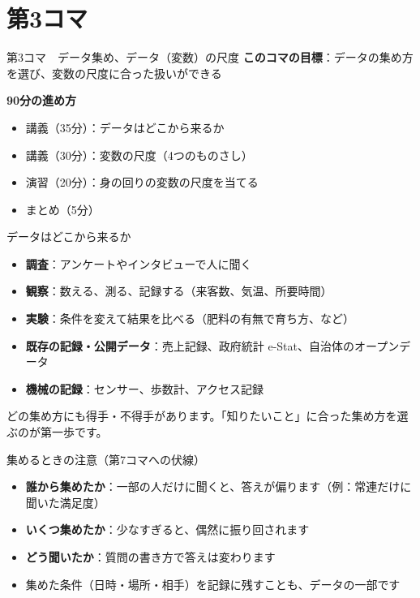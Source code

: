 \documentclass[aspectratio=169,11pt]{beamer}
\newcommand{\sess}[3]{%
\begin{frame}{#1}
\textbf{このコマの目標}：#2

\vspace{0.6em}
\textbf{90分の進め方}
\begin{itemize}
#3
\end{itemize}
\end{frame}}
\begin{document}
\section{第3コマ}
\sess{第3コマ　データ集め、データ（変数）の尺度}{データの集め方を選び、変数の尺度に合った扱いができる}
{\item 講義（35分）：データはどこから来るか
\item 講義（30分）：変数の尺度（4つのものさし）
\item 演習（20分）：身の回りの変数の尺度を当てる
\item まとめ（5分）}

\begin{frame}{データはどこから来るか}
\begin{itemize}
\item \textbf{調査}：アンケートやインタビューで人に聞く
\item \textbf{観察}：数える、測る、記録する（来客数、気温、所要時間）
\item \textbf{実験}：条件を変えて結果を比べる（肥料の有無で育ち方、など）
\item \textbf{既存の記録・公開データ}：売上記録、政府統計 e-Stat、自治体のオープンデータ
\item \textbf{機械の記録}：センサー、歩数計、アクセス記録
\end{itemize}
\vspace{0.5em}
どの集め方にも得手・不得手があります。「知りたいこと」に合った集め方を選ぶのが第一歩です。
\end{frame}

\begin{frame}{集めるときの注意（第7コマへの伏線）}
\begin{itemize}
\item \textbf{誰から集めたか}：一部の人だけに聞くと、答えが偏ります（例：常連だけに聞いた満足度）
\item \textbf{いくつ集めたか}：少なすぎると、偶然に振り回されます
\item \textbf{どう聞いたか}：質問の書き方で答えは変わります
\item 集めた条件（日時・場所・相手）を記録に残すことも、データの一部です
\end{itemize}
\end{frame}
\end{document}
